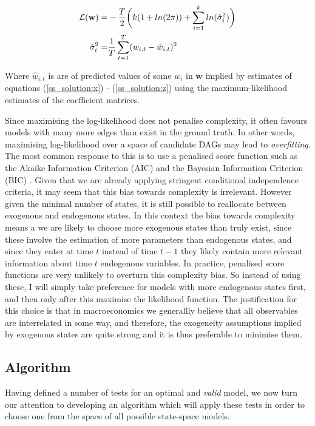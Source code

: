 \documentclass{article}
\begin{document}
\begin{align}
  \mathcal{L(\mathbf{w})} =& -\frac{T}{2} \bigg{(} 
  k (1 + ln(2\pi)) 
  + \sum_{i=1}^{k} ln(\hat{\sigma}_{i}^2)
  \bigg{)} \\
  \hat{\sigma}_{i}^2 =& \frac{1}{T} \sum_{t=1}^{T} (w_{i,t} - \hat{w}_{i,t})^2
\end{align}

Where $\hat{w}_{i,t}$ is are of predicted values of some $w_i$ in $\mathbf{w}$ implied by estimates of equations (\ref{ss_solution:x}) - (\ref{ss_solution:z}) using the maximum-likelihood estimates of the coefficient matrices.

Since maximising the log-likelihood does not penalise complexity, it often favours models with many more edges than exist in the ground truth. In other words, maximising log-likelihood over a space of candidate DAGs may lead to \textit{overfitting}. The most common response to this is to use a penalised score function such as the Akaike Information Criterion (AIC) \parencite{akaike1974new} and the Bayesian Information Criterion (BIC) \parencite{schwarz1978estimating}. Given that we are already applying stringent conditional independence criteria, it may seem that this bias towards complexity is irrelevant. However given the minimal number of states, it is still possible to reallocate between exogenous and endogenous states. In this context the bias towards complexity means a we are likely to choose more exogenous states than truly exist, since these involve the estimation of more parameters than endogenous states, and since they enter at time $t$ instead of time $t-1$ they likely contain more relevant information about time $t$ endogenous variables. In practice, penalised score functions are very unlikely to overturn this complexity bias. So instead of using these, I will simply take preference for models with more endogenous states first, and then only after this maximise the likelihood function. The justification for this choice is that in macroeconomics we generallly believe that all observables are interrelated in some way, and therefore, the exogeneity assumptions implied by exogenous states are quite strong and it is thus preferable to minimise them. 

\subsection{Algorithm} \label{algo}

Having defined a number of tests for an optimal and \textit{valid} model, we now turn our attention to developing an algorithm which will apply these tests in order to choose one from the space of all possible state-space models.
\end{document}
